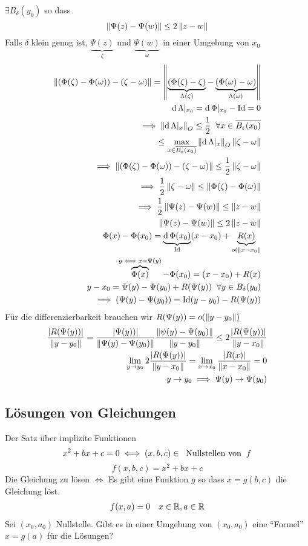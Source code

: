 \begin{Bem}
  $\exists B_\delta(y_0)$ so dass 
  \[\left\| \Psi(z)-\Psi(w) \right\|\leq 2\left\| z-w \right\|\]
  Falls $\delta$ klein genug ist, $\underbrace{\Psi(z)}_\zeta$ und $\underbrace{\Psi(w)}_\omega$ in einer Umgebung von $x_0$
  \begin{eqnarray*}
    \left\| (\Phi(\zeta)-\Phi(\omega))-(\zeta-\omega) \right\|=\left\| \underbrace{(\Phi(\zeta)-\zeta)}_{\Lambda(\zeta)}-\underbrace{(\Phi(\omega)-\omega)}_{\Lambda(\omega)} \right\|\\
    \operatorname{d}\Lambda|_{x_0}=\operatorname{d}\Phi|_{x_0}-\operatorname{Id} =0\\
    \implies\left\| \operatorname{d}\Lambda|_x \right\|_O\leq\frac{1}{2}\hspace{2mm}\forall x\in \overline{B_\varepsilon(x_0)}\\
    \leq\max_{x\in \overline{B_\varepsilon(x_0)}}\left\| \operatorname{d}\Lambda|_x \right\|_O\left\| \zeta-\omega \right\|\\
    \implies \left\| (\Phi(\zeta)-\Phi(\omega))-(\zeta-\omega) \right\|\leq\frac{1}{2}\left\| \zeta-\omega \right\|\\
    \implies \frac{1}{2}\left\| \zeta-\omega \right\|\leq\left\| \Phi(\zeta)-\Phi(\omega) \right\|\\
    \implies \frac{1}{2}\left\| \Psi(z)-\Psi(w) \right\|\leq\left\| z-w \right\|\\
    \left\| \Psi(z)-\Psi(w) \right\|\leq2\left\| z-w \right\|\\
    \Phi(x)-\Phi(x_0)=\underbrace{\operatorname{d}\Phi(x_0)}_{\operatorname{Id}} (x-x_0)+\underbrace{R(x)}_{o(\left\| x-x_0 \right\|}\\
    \overbrace{\Phi(x)}^{y\iff x=\Psi(y)}-\Phi(x_0)=(x-x_0)+R(x)\\
    y-x_0=\Psi(y)-\Psi(y_0)+R(\Psi(y))\hspace{2mm}\forall y\in B_\delta(y_0)\\
    \implies (\Psi(y)-\Psi(y_0))=\operatorname{Id} (y-y_0)-R(\Psi(y))\\
  \end{eqnarray*}
  Für die differenzierbarkeit brauchen wir $R(\Psi(y))=o(\left\| y-y_0 \right\|)$
  \begin{eqnarray*}
    \frac{\mathopen| R(\Psi(y)) \mathclose|}{\left\| y-y_0 \right\|}=\frac{\mathopen| \Psi(y)) \mathclose|}{\left\| \Psi(y)-\Psi(y_0) \right\|} \frac{\left\| \psi(y)-\Psi(y_0) \right\|}{\left\| y-y_0 \right\|}\leq 2\frac{\mathopen| R(\Psi(y)) \mathclose|}{\left\| y-x_0 \right\|}\\
    \lim_{y\rightarrow y_0}2\frac{\mathopen| R(\Psi(y)) \mathclose|}{\left\| y-x_0 \right\|}=\lim_{x\rightarrow x_0}\frac{\mathopen| R(x) \mathclose|}{\left\| x-x_0 \right\|}=0\\
    y\rightarrow y_0\implies \Psi(y)\rightarrow\Psi(y_0)
  \end{eqnarray*}
\end{Bem}
\subsection{Lösungen von Gleichungen}
Der Satz über implizite Funktionen
\[x^2+bx+c=0\iff(x,b,c)\in \hspace{2mm}\text{Nullstellen von}\hspace{2mm} f\]
\[f(x,b,c)=x^2+bx+c\]
Die Gleichung zu lösen $\iff$ Es gibt eine Funktion $g$ so dass $x=g(b,c)$ die Gleichung löst.
\begin{align*}
  f(x,a)=0 & & x\in\mathbb{R}, a\in\mathbb{R}
\end{align*}
Sei $(x_0,a_0)$ Nullstelle. Gibt es in einer Umgebung von $(x_0,a_0)$ eine ``Formel'' $x=g(a)$ für die Lösungen?
